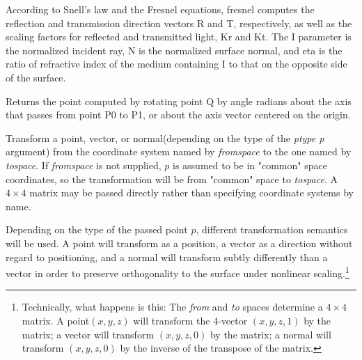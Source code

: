 \documentclass[11pt,letterpaper]{book}
\def\normal{{\cf normal}\xspace}
\def\point{{\cf point}\xspace}
\def\vector{{\cf vector}\xspace}
\def\commonspace{{\cf "common"} space\xspace}
\begin{document}
According to Snell's law and the Fresnel equations, {\cf fresnel}
computes the reflection and transmission direction vectors {\cf R} and
{\cf T}, respectively, as well as the scaling factors for reflected
and transmitted light, {\cf Kr} and {\cf Kt}.  The {\cf I} parameter
is the normalized incident ray, {\cf N} is the normalized surface normal,
and {\cf eta} is the ratio of refractive index of the medium
containing {\cf I} to that on the opposite side of the surface.
\apiend

Returns the point computed by rotating point {\cf Q} by {\cf angle}
radians about the axis that passes from point {\cf P0} to {\cf P1},
or about the {\cf axis} vector centered on the origin.
\apiend


Transform a \point, \vector, or \normal (depending on the type of the
\emph{ptype p} argument) from the coordinate system named by
\emph{fromspace} to the one named by \emph{tospace}.  If 
\emph{fromspace} is not supplied, $p$ is assumed to be in \commonspace
coordinates, so the transformation will be from \commonspace to
\emph{tospace}.  A $4 \times 4$ matrix may be passed directly rather
than specifying coordinate systems by name.

Depending on the type of the passed point $p$, different transformation
semantics will be used.  A \point will transform as a position, a
\vector as a direction without regard to positioning, and a \normal will
transform subtly differently than a \vector in order to preserve
orthogonality to the surface under nonlinear
scaling.\footnote{Technically, what happens is this: The \emph{from} and
  \emph{to} spaces determine a $4 \times 4$ matrix.  A \point $(x,y,z)$
  will transform the 4-vector $(x,y,z,1)$ by the matrix; a \vector will
  transform $(x,y,z,0)$ by the matrix; a \normal will transform
  $(x,y,z,0)$ by the inverse of the transpose of the matrix.}
\end{document}
